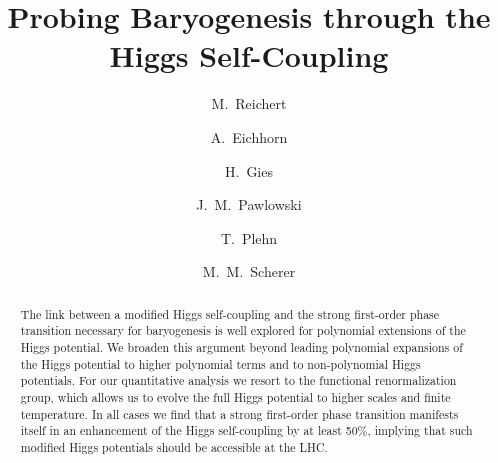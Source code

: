 \documentclass[aps,prd,11pt,tightenlines,superscriptaddress,nofootinbib,preprintnumbers,notitlepage]{revtex4-1}
\begin{document}
 
\title{Probing Baryogenesis through the Higgs Self-Coupling}


\author{M.~Reichert}

\author{A.~Eichhorn}


\author{H.~Gies}


\author{J.~M.~Pawlowski}


\author{T.~Plehn}


\author{M.~M.~Scherer}


\begin{abstract}
  The link between a modified Higgs self-coupling and the strong
  first-order phase transition necessary for baryogenesis is well
  explored for polynomial extensions of the Higgs potential. We
  broaden this argument beyond leading polynomial expansions of the
  Higgs potential to higher polynomial terms and to non-polynomial
  Higgs potentials. For our quantitative analysis we resort to the
  functional renormalization group, which allows us to evolve the full
  Higgs potential to higher scales and finite temperature. In all
  cases we find that a strong first-order phase transition manifests
  itself in an enhancement of the Higgs self-coupling by at least
  50\%, implying that such modified Higgs potentials should be
  accessible at the LHC.
\end{abstract}

\maketitle

\medskip 
\medskip 

\tableofcontents 

\clearpage
\end{document}
